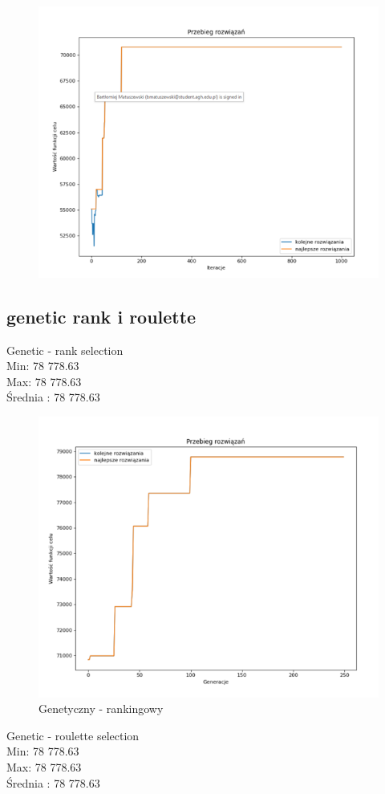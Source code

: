 \documentclass{article}
\begin{document}
\begin{figure}[H]
	\centering
	\includegraphics[width=0.7\linewidth]{screens/annealing_v2_zlych_przypadkow}
	\caption{}
	\label{fig:annealingv2zlychprzypadkow}
\end{figure}


\subsection{genetic rank i roulette}

Genetic - rank selection\\
Min: 78 778.63\\
Max: 78 778.63\\
Średnia : 78 778.63\\

\begin{figure}[H]
	\centering
	\includegraphics[width=0.7\linewidth]{screens/genetic_rank_zlych_przypadkow}
	\caption{Genetyczny - rankingowy}
	\label{fig:geneticrankzlychprzypadkow}
\end{figure}


Genetic - roulette selection\\
Min: 78 778.63\\
Max: 78 778.63\\
Średnia : 78 778.63\\
\end{document}
